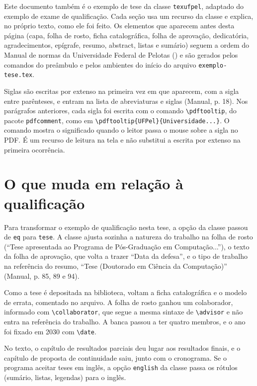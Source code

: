 \documentclass[tese,capa]{texufpel}
\begin{document}
Este documento também é o exemplo de tese da classe \texttt{texufpel},
adaptado do exemplo de exame de qualificação. Cada seção usa um recurso da
classe e explica, no próprio texto, como ele foi feito. Os elementos que
aparecem antes desta página (capa, folha de rosto, ficha catalográfica, folha
de aprovação, dedicatória, agradecimentos, epígrafe, resumo, abstract, listas
e sumário) seguem a ordem do Manual de normas da Universidade Federal de
Pelotas () e são gerados
pelos comandos do preâmbulo e pelos ambientes do início do arquivo
\texttt{exemplo-tese.tex}.

Siglas são escritas por extenso na primeira vez em que aparecem, com a sigla
entre parênteses, e entram na lista de abreviaturas e siglas (Manual, p. 18).
Nos parágrafos anteriores, cada sigla foi escrita com o comando
\verb|\pdftooltip|, do pacote \texttt{pdfcomment}, como em
\verb|\pdftooltip{UFPel}{Universidade...}|. O comando mostra o significado
quando o leitor passa o mouse sobre a sigla no PDF. É um recurso de leitura
na tela e não substitui a escrita por extenso na primeira ocorrência.

\section{O que muda em relação à qualificação}

Para transformar o exemplo de qualificação nesta tese, a opção da classe
passou de \texttt{eq} para \texttt{tese}. A classe ajusta sozinha a natureza
do trabalho na folha de rosto (``Tese apresentada ao Programa de
Pós-Graduação em Computação...''), o texto da folha de aprovação, que volta a
trazer ``Data da defesa'', e o tipo de trabalho na referência do resumo,
``Tese (Doutorado em Ciência da Computação)'' (Manual, p. 85, 89 e 94).

Como a tese é depositada na biblioteca, voltam a ficha catalográfica e o
modelo de errata, comentado no arquivo. A folha de rosto ganhou um
colaborador, informado com \verb|\collaborator|, que segue a mesma sintaxe de
\verb|\advisor| e não entra na referência do trabalho. A banca passou a ter
quatro membros, e o ano foi fixado em 2030 com \verb|\date|.

No texto, o capítulo de resultados parciais deu lugar aos resultados finais,
e o capítulo de proposta de continuidade saiu, junto com o cronograma. Se o
programa aceitar teses em inglês, a opção \texttt{english} da classe passa os
rótulos (sumário, listas, legendas) para o inglês.
\end{document}
